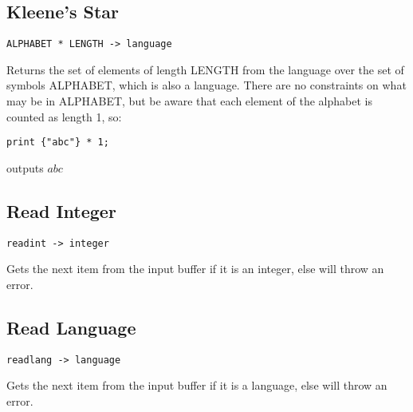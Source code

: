 \subsection{Kleene's Star}
\begin{center}
\begin{minipage}{6cm}
\begin{verbatim}
ALPHABET * LENGTH -> language
\end{verbatim}
\end{minipage}
\end{center}
\begin{normalsize}
Returns the set of elements of length LENGTH from the language over the set of symbols ALPHABET, which is also a language. There are no constraints on what may be in ALPHABET, but be aware that each element of the alphabet is counted as length 1, so:
\begin{center}
\begin{minipage}{5cm}
\begin{verbatim}
print {"abc"} * 1;
\end{verbatim}
\end{minipage}
\end{center}
outputs $ abc $
\end{normalsize}

\subsection{Read Integer}
\begin{center}
\begin{minipage}{5cm}
\begin{verbatim}
readint -> integer
\end{verbatim}
\end{minipage}
\end{center}
\begin{normalsize}
Gets the next item from the input buffer if it is an integer, else will throw an error.
\end{normalsize}

\subsection{Read Language}
\begin{center}
\begin{minipage}{5cm}
\begin{verbatim}
readlang -> language
\end{verbatim}
\end{minipage}
\end{center}
\begin{normalsize}
Gets the next item from the input buffer if it is a language, else will throw an error.
\end{normalsize}




\iffalse
\subsection{Addition}
\begin{center}
\begin{minipage}{5cm}
\begin{verbatim}
LANG I LANG -> 
\end{verbatim}
\end{minipage}
\end{center}
\begin{normalsize}

\end{normalsize}
\fi